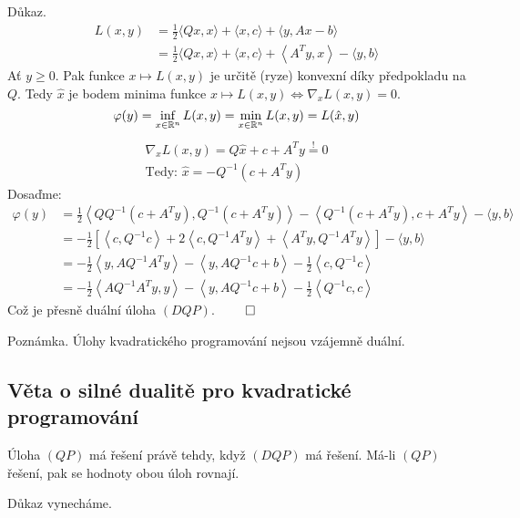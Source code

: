 Důkaz.
\begin{align*}
    L(x,y) &= \frac{1}{2}\langle Qx, x\rangle + \langle x, c\rangle + \langle y, Ax-b\rangle\\
    &= \frac{1}{2}\langle Qx, x\rangle + \langle x, c\rangle + \left\langle A^Ty, x\right\rangle - \langle y,b\rangle
\end{align*}
Ať $y \geq 0$. Pak funkce $x \mapsto L(x, y)$ je určitě (ryze) konvexní díky předpokladu na $Q$. Tedy $\hat x$ je bodem
minima funkce $x \mapsto L(x, y) \iff \nabla_x L(x, y) = 0$.
\[
    \varphi(y) = \inf_{x \in \mathbb{R}^n} L(x, y) = \min_{x \in \mathbb{R}^n} L(x, y) = L(\hat x, y)
\]
\begin{align*}
    \nabla_x L(x, y) = Q \hat x + c + A^Ty \overset{!}{=} 0 \\
    \text{Tedy: } \hat x = -Q^{-1}(c + A^Ty)
\end{align*}
Dosaďme:
\begin{align*}
    \varphi(y) &= \frac{1}{2}\left\langle QQ^{-1}(c + A^Ty), Q^{-1}(c + A^Ty)\right\rangle - 
    \left\langle Q^{-1}(c + A^Ty), c+A^Ty\right\rangle - \langle y,b\rangle \\
    &= -\frac{1}{2}\left[\left\langle c, Q^{-1}c\right\rangle + 2\left\langle c, Q^{-1}A^Ty\right\rangle
    + \left\langle A^Ty, Q^{-1}A^Ty\right\rangle\right] - \langle y, b\rangle \\
    &= -\frac{1}{2}\left\langle y, AQ^{-1}A^Ty\right\rangle - \left\langle y, AQ^{-1}c+b\right\rangle
    -\frac{1}{2}\left\langle c, Q^{-1}c\right\rangle \\
    &= -\frac{1}{2}\left\langle AQ^{-1}A^Ty, y\right\rangle - \left\langle y, AQ^{-1}c+b\right\rangle
    -\frac{1}{2}\left\langle Q^{-1}c, c\right\rangle
\end{align*}
Což je přesně duální úloha $(DQP)$. $\qed$

Poznámka. Úlohy kvadratického programování nejsou vzájemně duální.

\subsection{Věta o silné dualitě pro kvadratické programování}
Úloha $(QP)$ má řešení právě tehdy, když $(DQP)$ má řešení. Má-li $(QP)$ řešení, pak se hodnoty obou úloh rovnají.

Důkaz vynecháme.